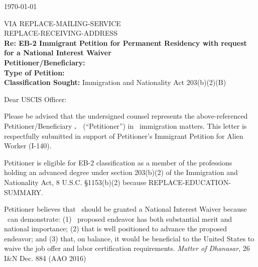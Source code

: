 \documentclass{pl_template}  %
\begin{document}
\firstpageheader


\begin{center}
    \today
\end{center}

\vspace{2em}
\raggedright{  %
VIA REPLACE-MAILING-SERVICE\\
REPLACE-RECEIVING-ADDRESS\\
\vspace{2em}
\textbf{Re: EB-2 Immigrant Petition for Permanent Residency with request for a National Interest Waiver} \\
\textbf{Petitioner/Beneficiary:} \Petitioner\\
\textbf{Type of Petition:} \TypeOfPetitionShort\\
\textbf{Classification Sought:}  Immigration and Nationality Act 203(b)(2)(B) \\
}

\vspace{3em}

\noindent Dear USCIS Officer:

\hspace*{2em} Please be advised that the undersigned counsel represents the above-referenced Petitioner/Beneficiary \textbf{\MrMs.\  \Petitioner} (“Petitioner”) in \HisHerLow \   immigration matters. This letter is respectfully submitted in support of Petitioner’s Immigrant Petition for Alien Worker (I-140).

\hspace*{2em}Petitioner is eligible for EB-2 classification as a member of the professions holding an advanced degree under section 203(b)(2) of the Immigration and Nationality Act, 8 U.S.C. §1153(b)(2) because REPLACE-EDUCATION-SUMMARY.

\hspace*{2em}Petitioner believes that \HeSheLow \ should be granted a National Interest Waiver because \HeSheLow \  can demonstrate: (1) \HisHerLow \  proposed endeavor has both substantial merit and national importance; (2) that \HeSheLow is well positioned to advance the proposed endeavor; and (3) that, on balance, it would be beneficial to the United States to waive the job offer and labor certification requirements. \textit{Matter of Dhanasar}, 26 I\&N Dec. 884 (AAO 2016)




\newpage  %
\otherpagesheader  %
\tableofcontents
\end{document}
